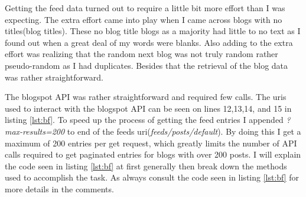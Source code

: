 \documentclass[letterpaper,10pt]{article}
\begin{document}
Getting the feed data turned out to require a little bit more effort than I was expecting. The extra effort came into play when I came across blogs with no titles(blog titles). These no blog title blogs as a majority had little to no text as I found out when a great deal of my words were blanks. Also adding to the extra effort was realizing that the random next blog was not truly random rather pseudo-random as I had duplicates. Besides that the retrieval of the blog data was rather straightforward.

The blogspot API was rather straightforward and required few calls. The uris used to interact with the blogspot API can be seen on lines 12,13,14, and 15 in listing \hyperref[lst:bf]{\ref{lst:bf}}. To speed up the process of getting the feed entries I appended \emph{?max-results=200} to end of the feeds uri(\emph{feeds/posts/default}). By doing this I get a maximum of 200 entries per get request, which greatly limits the number of API calls required to get paginated entries for blogs with over 200 posts.
\newpage
I will explain the code seen in listing \hyperref[lst:bf]{\ref{lst:bf}} at first generally then break down the methods used to accomplish the task. As always consult the code seen in listing \hyperref[lst:bf]{\ref{lst:bf}} for more details in the comments.
\end{document}
